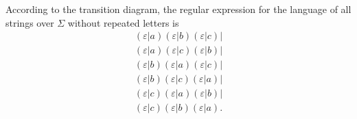\documentclass{CompilerAssignment}
\begin{document}
According to the transition diagram, the regular expression for the language of all strings over $\Sigma$ without repeated letters is
\begin{align*}
    \left(\varepsilon|a\right)\left(\varepsilon|b\right)\left(\varepsilon|c\right)| \\
    \left(\varepsilon|a\right)\left(\varepsilon|c\right)\left(\varepsilon|b\right)| \\
    \left(\varepsilon|b\right)\left(\varepsilon|a\right)\left(\varepsilon|c\right)| \\
    \left(\varepsilon|b\right)\left(\varepsilon|c\right)\left(\varepsilon|a\right)| \\
    \left(\varepsilon|c\right)\left(\varepsilon|a\right)\left(\varepsilon|b\right)| \\
    \left(\varepsilon|c\right)\left(\varepsilon|b\right)\left(\varepsilon|a\right).
\end{align*}
\end{document}
